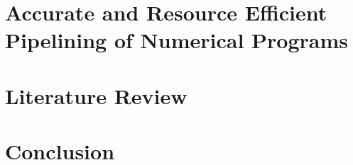 









\chapter{Accurate and Resource Efficient Pipelining of Numerical Programs}
\label{chp:latopt}














\chapter{Literature Review}
\label{chp:litrev}

\chapter{Conclusion}
\label{chp:conclusion}


